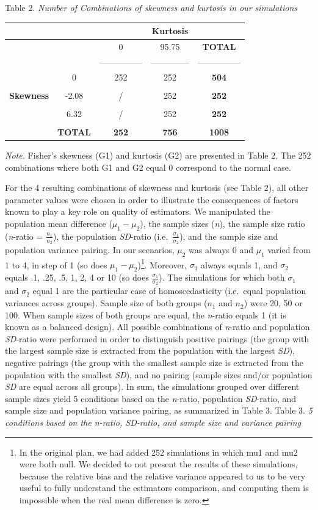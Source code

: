 \documentclass[
  man,floatsintext]{apa6}
\begin{document}
Table 2.
\emph{Number of Combinations of skewness and kurtosis in our simulations}

\begin{longtable}[]{@{}ccccc@{}}
\toprule
& & & \textbf{Kurtosis} &\tabularnewline
\midrule
\endhead
& & 0 & 95.75 & \textbf{TOTAL}\tabularnewline
& & --------------- & -------------- & ---------------\tabularnewline
& 0 & 252 & 252 & \textbf{504}\tabularnewline
& & & &\tabularnewline
\textbf{Skewness} & -2.08 & / & 252 & \textbf{252}\tabularnewline
& & & &\tabularnewline
& 6.32 & / & 252 & \textbf{252}\tabularnewline
& & & &\tabularnewline
& \textbf{TOTAL} & \textbf{252} & \textbf{756} & \textbf{1008}\tabularnewline
\bottomrule
\end{longtable}

\emph{Note.} Fisher's skewness (G1) and kurtosis (G2) are presented in Table 2. The 252 combinations where both G1 and G2 equal 0 correspond to the normal case.

For the 4 resulting combinations of skewness and kurtosis (see Table 2), all other parameter values were chosen in order to illustrate the consequences of factors known to play a key role on quality of estimators. We manipulated the population mean difference (\(\mu_1-\mu_2\)), the sample sizes (\emph{n}), the sample size ratio (\emph{n}-ratio = \(\frac{n_1}{n_2}\)), the population \emph{SD}-ratio (i.e.~\(\frac{\sigma_1}{\sigma_2}\)), and the sample size and population variance pairing. In our scenarios, \(\mu_2\) was always 0 and \(\mu_1\) varied from 1 to 4, in step of 1 (so does \(\mu_1-\mu_2\))\footnote{In the original plan, we had added 252 simulations in which mu1 and mu2 were both null. We decided to not present the results of these simulations, because the relative bias and the relative variance appeared to us to be very useful to fully understand the estimators comparison, and computing them is impossible when the real mean difference is zero. }. Moreover, \(\sigma_1\) always equals 1, and \(\sigma_2\) equals .1, .25, .5, 1, 2, 4 or 10 (so does \(\frac{\sigma_1}{\sigma_2}\)). The simulations for which both \(\sigma_1\) and \(\sigma_2\) equal 1 are the particular case of homoscedasticity (i.e.~equal population variances across groups). Sample size of both groups (\(n_1\) and \(n_2\)) were 20, 50 or 100. When sample sizes of both groups are equal, the \emph{n}-ratio equals 1 (it is known as a balanced design). All possible combinations of \emph{n}-ratio and population \emph{SD}-ratio were performed in order to distinguish positive pairings (the group with the largest sample size is extracted from the population with the largest \emph{SD}), negative pairings (the group with the smallest sample size is extracted from the population with the smallest \emph{SD}), and no pairing (sample sizes and/or population \emph{SD} are equal across all groups). In sum, the simulations grouped over different sample sizes yield 5 conditions based on the \emph{n}-ratio, population \emph{SD}-ratio, and sample size and population variance pairing, as summarized in Table 3.
Table 3.
\emph{5 conditions based on the n-ratio, SD-ratio, and sample size and variance pairing}
\end{document}
